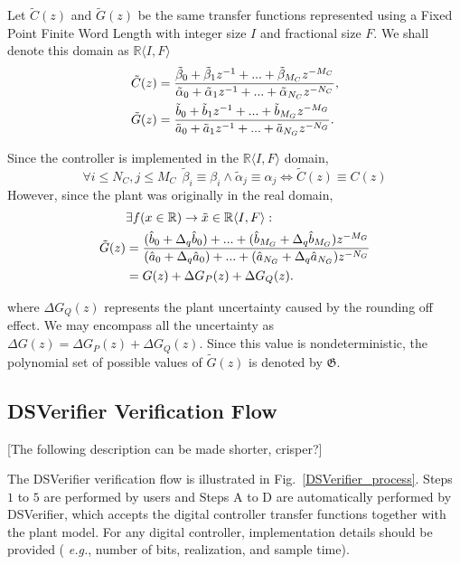 \documentclass{sig-alternate-05-2015}
\newcommand{\red}[1]{{\color{red}#1}}
\begin{document}
Let $\tilde C(z)$ and $\tilde G(z)$ be the same transfer functions represented using a Fixed Point Finite Word Length with integer size $I$ and fractional size $F$. We shall denote this domain as $\mathbb{R}\langle I,F \rangle$
\begin{align}
\small
\label{digital_controller_plant_tf}
\tilde C(z)&=\frac{\tilde \beta_{0}+\tilde \beta_{1}z^{-1}+...+\tilde \beta_{M_C}z^{-M_C}}{\tilde \alpha_{0}+\tilde \alpha_{1}z^{-1}+...+\tilde \alpha_{N_C}z^{-N_C}}, \\
\tilde G(z)&=\frac{\tilde b_{0}+\tilde b_{1}z^{-1}+...+\tilde b_{M_G}z^{-M_G}}{\tilde a_{0}+\tilde a_{1}z^{-1}+...+\tilde a_{N_G}z^{-N_G}}.
\end{align}
 
Since the controller is implemented in the $\mathbb{R}\langle I,F \rangle$ domain, 
 $$\forall i \leq N_C, j \leq M_C\ \  \tilde \beta_{i} \equiv \beta_{i} \wedge \tilde \alpha_{j} \equiv \alpha_{j} \Leftrightarrow \tilde C(z) \equiv C(z)$$
However, since the plant was originally in the real domain,
\begin{align}
\small
\label{digital_plant_tf}
&\exists f (x \in \mathbb{R}) \rightarrow \tilde x \in \mathbb{R}\langle I,F \rangle : \nonumber \\
\tilde G(z)&=\frac{(\hat{b}_{0}+\Delta_q \hat{b}_{0}) +...+(\hat{b}_{M_G}+\Delta_q \hat{b}_{M_G})z^{-M_G}}{(\hat{a}_{0}+\Delta_q \hat{a}_{0})+...+(\hat{a}_{N_G}+\Delta_q \hat{a}_{N_G})z^{-N_G}} \nonumber \\
&=G(z)+\Delta{G}_P(z)+\Delta{G}_Q(z).
\end{align}
 
\vspace{1 mm} 
\noindent where $\Delta{G}_Q(z)$ represents the plant uncertainty caused by the rounding off effect. We may encompass all the uncertainty as $\Delta{G}(z)=\Delta{G}_P(z)+\Delta{G}_Q(z)$. Since this value is nondeterministic, the polynomial set of possible values of $\tilde G(z)$ is denoted by $\mathfrak{G}$.

\subsection{DSVerifier Verification Flow}
\label{verification-flow}

\red{[The following description can be made shorter, crisper?]}

The DSVerifier verification flow is illustrated in
Fig.~\ref{DSVerifier_process}.  Steps $1$ to $5$ are performed by users and
Steps A to D are automatically performed by DSVerifier, which accepts the
digital controller transfer functions together with the plant model.  For
any digital controller, implementation details should be provided ({\it
e.g.}, number of bits, realization, and sample time).
\end{document}
